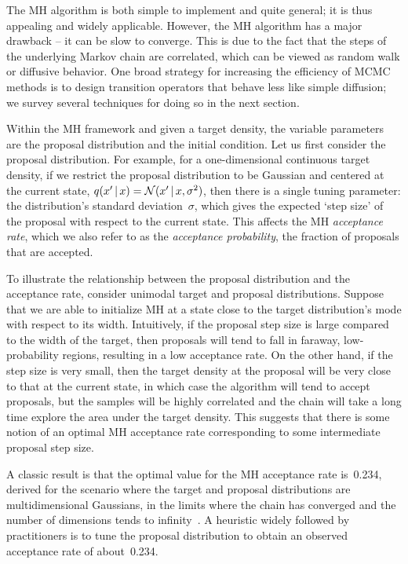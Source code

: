 \documentclass[angelino.tex]{subfiles}
\begin{document}
The MH algorithm is both simple to implement and quite general;
it is thus appealing and widely applicable.
However, the MH algorithm has a major drawback -- it can be slow to converge.
This is due to the fact that the steps of the underlying Markov chain
are correlated, which can be viewed as random walk or diffusive behavior.
One broad strategy for increasing the efficiency of MCMC methods is to
design transition operators that behave less like simple diffusion;
we survey several techniques for doing so in the next section.

Within the MH framework and given a target density, the variable parameters are
the proposal distribution and the initial condition.
Let us first consider the proposal distribution.
For example, for a one-dimensional continuous target density, if we restrict
the proposal distribution to be Gaussian and centered at the current state,
$q(x' \,|\, x) = {\mathcal N}(x' \,|\, x, \sigma^2)$,
then there is a single tuning parameter: the distribution's standard
deviation~$\sigma$, which gives the expected `step size' of the proposal
with respect to the current state.
This affects the MH \emph{acceptance rate}, 
which we also refer to as the \emph{acceptance probability},
\ie the fraction of proposals that are accepted.

To illustrate the relationship between the proposal distribution and the
acceptance rate, consider unimodal target and proposal distributions.
Suppose that we are able to initialize MH at a state
close to the target distribution's mode with respect to its width.
Intuitively, if the proposal step size is large compared to the width of the
target, then proposals will tend to fall in faraway, low-probability regions,
resulting in a low acceptance rate.
On the other hand, if the step size is very small, then the target density
at the proposal will be very close to that at the current state,
in which case the algorithm will tend to accept proposals,
but the samples will be highly correlated and the chain will take a long time
explore the area under the target density.
This suggests that there is some notion of an optimal MH acceptance rate
corresponding to some intermediate proposal step size.

A classic result is that the optimal value for the MH acceptance rate is~0.234, 
derived for the scenario where the target and proposal distributions are 
multidimensional Gaussians, in the limits where the chain has converged and
the number of dimensions tends to infinity~\citep{roberts-1997-accept}.
A heuristic widely followed by practitioners is to tune the proposal
distribution to obtain an observed acceptance rate of about~0.234.
\end{document}
